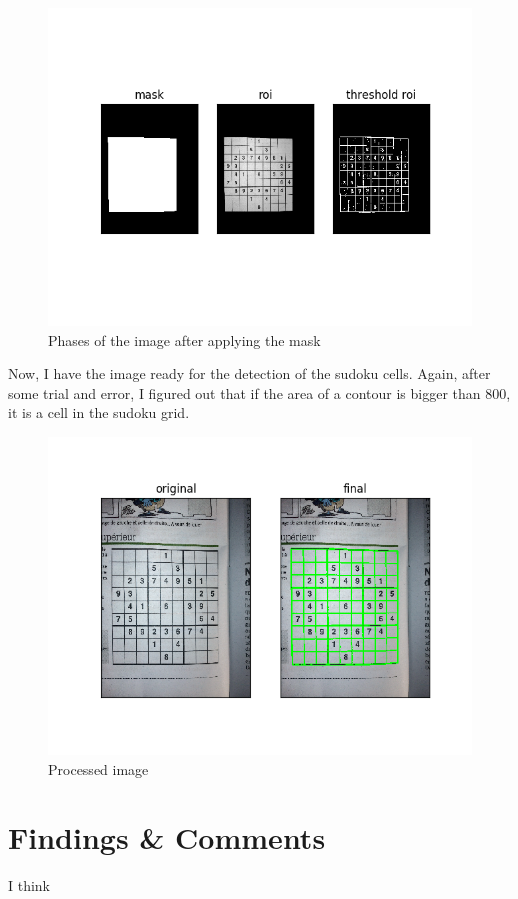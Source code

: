\begin{figure}[H]
    \centering
    \includegraphics[width=\textwidth]{images/masked.png}
    \caption{Phases of the image after applying the mask}
    \setlength{\belowcaptionskip}{-20pt}
    \setlength{\abovecaptionskip}{-20pt}
\end{figure}

Now, I have the image ready for the detection of the sudoku cells. Again, after some trial and error, I figured out that if the area of a contour is bigger than 800, it is a cell in the sudoku grid.

\begin{figure}[H]
    \centering
    \includegraphics[width=\textwidth]{images/final.png}
    \caption{Processed image}
    \setlength{\belowcaptionskip}{-20pt}
    \setlength{\abovecaptionskip}{-20pt}
\end{figure}

\section*{Findings \& Comments}
I think

